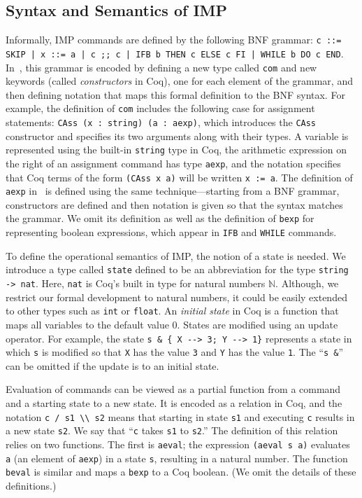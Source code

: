 \documentclass[compsoc,conference,a4paper,10pt,times]{IEEEtran}
\begin{document}
\subsection{Syntax and Semantics of IMP}
\label{sec:syntaxsemantics}
Informally, IMP commands are defined by the following BNF grammar:
\texttt{c ::= SKIP | x ::= a | c ;; c | IFB b THEN c ELSE c FI | WHILE b DO c END}.
In~\cite{SFV2}, this grammar is encoded by defining a new type called \texttt{com} and new keywords (called \emph{constructors} in Coq), one for each element of the grammar, and then defining notation that maps this formal definition to the BNF syntax.  For example, the definition of \texttt{com} includes the following case for assignment statements: \texttt{CAss (x : string) (a : aexp)}, which introduces the \texttt{CAss} constructor and specifies its two arguments along with their types.  A variable is represented using the built-in \texttt{string} type in Coq, the arithmetic expression on the right of an assignment command has type \texttt{aexp}, and the notation specifies that Coq terms of the form \texttt{(CAss x a)} will be written \texttt{x := a}.
The definition of \texttt{aexp} in~\cite{SFV2} is defined using the same technique---starting from a BNF grammar, constructors are defined and then notation is given so that the syntax matches the grammar.  We omit its definition as well as the definition of \texttt{bexp} for representing boolean expressions, which appear in \texttt{IFB} and \texttt{WHILE} commands.

To define the operational semantics of IMP, the notion of a state is needed. We introduce a type called \texttt{state} defined to be an abbreviation for the type \texttt{string -> nat}.  Here, \texttt{nat} is Coq's built in type for natural numbers $\mathbb{N}$.  Although, we restrict our formal development to natural numbers, it could be easily extended to other types such as \texttt{int} or \texttt{float}.  An \textit{initial state} in Coq is a function that maps all variables to the default value $0$.  States are modified using an update operator.  For example, the state \verb|s & { X --> 3; Y --> 1}| represents a state in which \texttt{s} is modified so that \texttt{X} has the value \texttt{3} and \texttt{Y} has the value \texttt{1}.  The ``\verb|s &|'' can be omitted if the update is to an initial state.

Evaluation of commands can be viewed as a partial function from a command and a starting state to a new state.  It is encoded as a relation in Coq, and the notation \verb|c / s1 \\ s2| means that starting in state \texttt{s1} and executing \texttt{c} results in a new state \texttt{s2}.  We say that ``\texttt{c} takes \texttt{s1} to \texttt{s2}.''  The definition of this relation relies on two functions.  The first is \texttt{aeval};
the expression \texttt{(aeval s a)} evaluates \texttt{a} (an element of \texttt{aexp}) in a state \texttt{s}, resulting in a natural number. The function \texttt{beval} is similar and maps a \texttt{bexp} to a Coq boolean.  (We omit the details of these definitions.)
\end{document}

